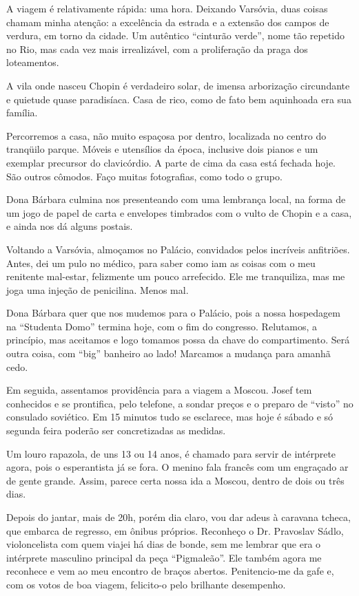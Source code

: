 A viagem é relativamente rápida: uma hora. Deixando Varsóvia, duas coisas chamam minha atenção: a excelência da estrada e a extensão dos campos de verdura, em torno da cidade. Um autêntico ``cinturão verde'', nome tão repetido no Rio, mas cada vez mais irrealizável, com a proliferação da praga dos loteamentos.

A vila onde nasceu Chopin é verdadeiro solar, de imensa arborização circundante e quietude quase paradisíaca. Casa de rico, como de fato bem aquinhoada era sua família.

Percorremos a casa, não muito espaçosa por dentro, localizada no centro do tranqüilo parque. Móveis e utensílios da época, inclusive dois pianos e um exemplar precursor do clavicórdio. A parte de cima da casa está fechada hoje. São outros cômodos. Faço muitas fotografias, como todo o grupo.

Dona Bárbara culmina nos presenteando com uma lembrança local, na forma de um jogo de papel de carta e envelopes timbrados com o vulto de Chopin e a casa, e ainda nos dá alguns postais.

Voltando a Varsóvia, almoçamos no Palácio, convidados pelos incríveis anfitriões. Antes, dei um pulo no médico, para saber como iam as coisas com o meu renitente mal-estar, felizmente um pouco arrefecido. Ele me tranquiliza, mas me joga uma injeção de penicilina. Menos mal.

Dona Bárbara quer que nos mudemos para o Palácio, pois a nossa hospedagem na ``Studenta Domo'' termina hoje, com o fim do congresso. Relutamos, a princípio, mas aceitamos e logo tomamos possa da chave do compartimento. Será outra coisa, com ``big'' banheiro ao lado! Marcamos a mudança para amanhã cedo.

Em seguida, assentamos providência para a viagem a Moscou. Josef tem conhecidos e se prontifica, pelo telefone, a sondar preços e o preparo de ``visto'' no consulado soviético. Em 15 minutos tudo se esclarece, mas hoje é sábado e só segunda feira poderão ser concretizadas as medidas.

Um louro rapazola, de uns 13 ou 14 anos, é chamado para servir de intérprete agora, pois o esperantista já se fora. O menino fala francês com um engraçado ar de gente grande. Assim, parece certa nossa ida a Moscou, dentro de dois ou três dias.

Depois do jantar, mais de 20h, porém dia claro, vou dar adeus à caravana tcheca, que embarca de regresso, em ônibus próprios. Reconheço o Dr. Pravoslav Sádlo, violoncelista com quem viajei há dias de bonde, sem me lembrar que era o intérprete masculino principal da peça ``Pigmaleão''. Ele também agora me reconhece e vem ao meu encontro de braços abertos. Penitencio-me da gafe e, com os votos de boa viagem, felicito-o pelo brilhante desempenho.

